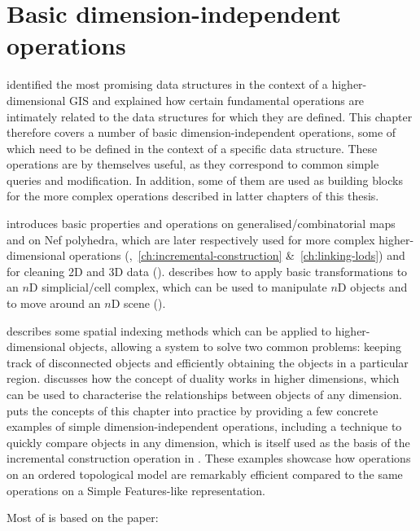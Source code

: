 
\chapter{Basic dimension-independent operations}
\label{ch:operations-background}

 identified the most promising data structures in the context of a higher-dimensional GIS and explained how certain fundamental operations are intimately related to the data structures for which they are defined.
This chapter therefore covers a number of basic dimension-independent operations, some of which need to be defined in the context of a specific data structure.
These operations are by themselves useful, as they correspond to common simple queries and modification.
In addition, some of them are used as building blocks for the more complex operations described in latter chapters of this thesis.

 introduces basic properties and operations on generalised/combinatorial maps and on Nef polyhedra, which are later respectively used for more complex higher-dimensional operations (,~\ref{ch:incremental-construction} \&~\ref{ch:linking-lods}) and for cleaning 2D and 3D data ().
 describes how to apply basic transformations to an $n$D simplicial/cell complex, which can be used to manipulate $n$D objects and to move around an $n$D scene ().

 describes some spatial indexing methods which can be applied to higher-dimensional objects, allowing a system to solve two common problems: keeping track of disconnected objects and efficiently obtaining the objects in a particular region.
 discusses how the concept of duality works in higher dimensions, which can be used to characterise the relationships between objects of any dimension.
 puts the concepts of this chapter into practice by providing a few concrete examples of simple dimension-independent operations, including a technique to quickly compare objects in any dimension, which is itself used as the basis of the incremental construction operation in .
These examples showcase how operations on an ordered topological model are remarkably efficient compared to the same operations on a Simple Features-like representation.

Most of  is based on the paper:
\begin{itemize}
\papergeoadvancesnd%
\end{itemize}

